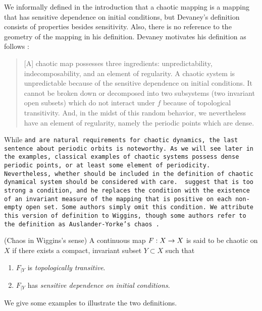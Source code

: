 \documentclass[10pt,draft,twoside]{book}
\begin{document}
We informally defined in the introduction that a chaotic mapping is a mapping that has sensitive dependence on initial conditions, but Devaney's definition consists of properties besides sensitivity.
Also, there is no reference to the geometry of the mapping in his definition.
Devaney motivates his definition as follows \citep[p.50]{devaney}:
\begin{quotation}
  [A] chaotic map possesses three ingredients:
  unpredictability, indecomposability, and an element of regularity.
  A chaotic system is unpredictable because of the sensitive dependence on initial conditions.
  It cannot be broken down or decomposed into two subsystems (two invariant open subsets) which do not interact under $f$ because of topological transitivity.
  And, in the midst of this random behavior, we nevertheless have an element of regularity, namely the periodic points which are dense.
\end{quotation}
While \tt and \sdic are natural requirements for chaotic dynamics, the last sentence about periodic orbits is noteworthy.
As we will see later in the examples, classical examples of chaotic systems possess dense periodic points, or at least some element of periodicity.
Nevertheless, whether \dpp should be included in the definition of chaotic dynamical system should be considered with care.
\citet{glasner} suggest that \dpp is too strong a condition, and he replaces the condition with the existence of an invariant measure of the mapping that is positive on each non-empty open set. 
Some authors simply omit this condition.
We attribute this version of definition to Wiggins, though some authors refer to the definition as Auslander-Yorke's chaos \citep{blanchard}.
\begin{definition}
  (Chaos in Wiggins's sense)
  A continuous map $F: X\rightarrow X$ is said to be chaotic on $X$ if there exists a compact, invariant subset $Y \subset X$ such that
  \begin{enumerate}
    \item $F_{|Y}$ is \textit{topologically transitive}.
    \item $F_{|Y}$ has \textit{sensitive dependence on initial conditions}.
  \end{enumerate}
\end{definition}
We give some examples to illustrate the two definitions.
\end{document}
